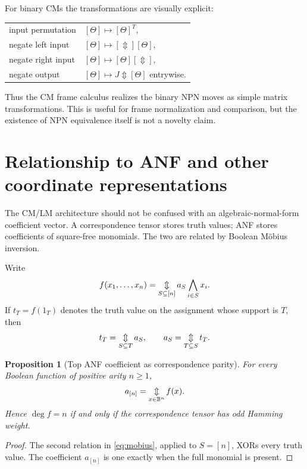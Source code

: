 \documentclass[11pt]{article}
\newtheorem{proposition}[theorem]{Proposition}
\theoremstyle{definition}
\theoremstyle{remark}
\newcommand{\B}{\mathbb B}
\newcommand{\xor}{\mathbin{\Updownarrow}}
\newcommand{\bigxor}{\mathop{\Updownarrow}\displaylimits}
\begin{document}
For binary CMs the transformations are visually explicit:
\begin{center}
\begin{tabular}{ll}
input permutation & $[\Theta]\mapsto[\Theta]^T$,\\
negate left input & $[\Theta]\mapsto[\Updownarrow][\Theta]$,\\
negate right input & $[\Theta]\mapsto[\Theta][\Updownarrow]$,\\
negate output & $[\Theta]\mapsto J\xor[\Theta]$ entrywise.
\end{tabular}
\end{center}
Thus the CM frame calculus realizes the binary NPN moves as simple matrix transformations.  This is useful for frame normalization and comparison, but the existence of NPN equivalence itself is not a novelty claim.

\section{Relationship to ANF and other coordinate representations}
\label{sec:anf}

The CM/LM architecture should not be confused with an algebraic-normal-form coefficient vector.  A correspondence tensor stores truth values; ANF stores coefficients of square-free monomials.  The two are related by Boolean M\"obius inversion.

Write
\begin{equation}
 f(x_1,\ldots,x_n)
 =\bigxor_{S\subseteq[n]}
 a_S\bigwedge_{i\in S}x_i.
 \label{eq:anf}
\end{equation}
If $t_T=f(1_T)$ denotes the truth value on the assignment whose support is $T$, then
\begin{equation}
 t_T=\bigxor_{S\subseteq T}a_S,
 \qquad
 a_S=\bigxor_{T\subseteq S}t_T.
 \label{eq:mobius}
\end{equation}

\begin{proposition}[Top ANF coefficient as correspondence parity]
For every Boolean function of positive arity $n\ge1$,
\begin{equation}
 a_{[n]}=\bigxor_{x\in\B^n}f(x).
 \label{eq:topparity}
\end{equation}
Hence $\deg f=n$ if and only if the correspondence tensor has odd Hamming weight.
\end{proposition}
\begin{proof}
The second relation in \eqref{eq:mobius}, applied to $S=[n]$, XORs every truth value.  The coefficient $a_{[n]}$ is one exactly when the full monomial is present.
\end{proof}
\end{document}
